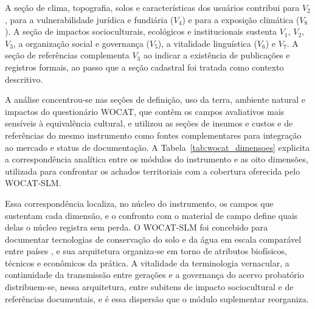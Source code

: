 \documentclass[preprint,authoryear,12pt]{elsarticle}
\begin{document}
A seção de clima, topografia, solos e características dos usuários contribui para $V_2$, para a vulnerabilidade jurídica e fundiária ($V_4$) e para a exposição climática ($V_8$). A seção de impactos socioculturais, ecológicos e institucionais sustenta $V_1$, $V_2$, $V_3$, a organização social e governança ($V_5$), a vitalidade linguística ($V_6$) e $V_7$. A seção de referências complementa $V_3$ ao indicar a existência de publicações e registros formais, ao passo que a seção cadastral foi tratada como contexto descritivo.

A análise concentrou-se nas seções de definição, uso da terra, ambiente natural e impactos do questionário WOCAT, que contêm os campos avaliativos mais sensíveis à equivalência cultural, e utilizou as seções de insumos e custos e de referências do mesmo instrumento como fontes complementares para integração ao mercado e status de documentação. A Tabela~\ref{tab:wocat_dimensoes} explicita a correspondência analítica entre os módulos do instrumento e as oito dimensões, utilizada para confrontar os achados territoriais com a cobertura oferecida pelo WOCAT-SLM.

Essa correspondência localiza, no núcleo do instrumento, os campos que sustentam cada dimensão, e o confronto com o material de campo define quais delas o núcleo registra sem perda. O WOCAT-SLM foi concebido para documentar tecnologias de conservação do solo e da água em escala comparável entre países \citep{Liniger2019,Schwilch2011}, e sua arquitetura organiza-se em torno de atributos biofísicos, técnicos e econômicos da prática. A vitalidade da terminologia vernacular, a continuidade da transmissão entre gerações e a governança do acervo probatório distribuem-se, nessa arquitetura, entre subitens de impacto sociocultural e de referências documentais, e é essa dispersão que o módulo suplementar reorganiza.
\end{document}
